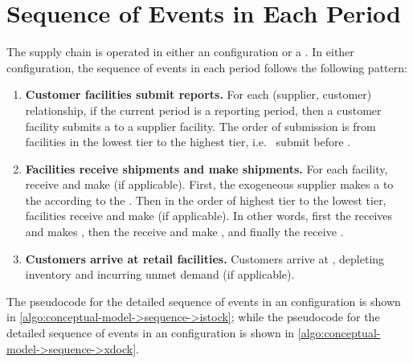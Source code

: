 \section{Sequence of Events in Each Period}
\label{section:conceptual-model->sequence-of-events}

The supply chain is operated
in either an  configuration
or a .
In either configuration,
the sequence of events in each period follows the following pattern:
\begin{enumerate}
\item
\textbf{Customer facilities submit reports.}
For each (supplier, customer) relationship,
if the current period is a reporting period,
then a customer facility submits a  to a supplier facility.
The order of  submission
is from facilities in the lowest tier to the highest tier,
i.e.\  submit 
before .
\item
\textbf{Facilities receive shipments and make shipments.}
For each facility,
receive  and make  (if applicable).
First, the exogeneous supplier makes a 
to the 
according to the .
Then in the order of highest tier to the lowest tier,
facilities receive 
and make  (if applicable).
In other words,
first the  receives and makes ,
then the  receive and make ,
and finally the  receive .
\item
\textbf{Customers arrive at retail facilities.}
Customers arrive at ,
depleting inventory and incurring unmet demand (if applicable).
\end{enumerate}



The pseudocode for the detailed sequence of events
in an  configuration
is shown in \autoref{algo:conceptual-model->sequence->istock};
while the pseudocode for the detailed sequence of events
in an  configuration
is shown in \autoref{algo:conceptual-model->sequence->xdock}.


